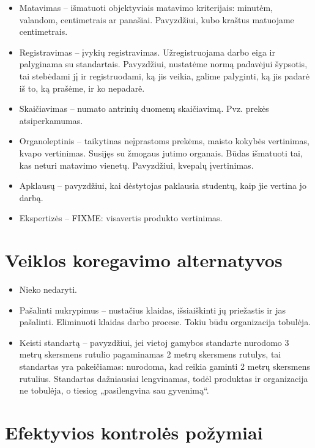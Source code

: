 \begin{itemize}
  \item Matavimas – išmatuoti objektyviais matavimo kriterijais: minutėm,
    valandom, centimetrais ar panašiai. Pavyzdžiui, kubo kraštus matuojame
    centimetrais.
  \item Registravimas – įvykių registravimas. Užregistruojama darbo
    eiga ir palyginama su standartais. Pavyzdžiui, nustatėme normą padavėjui
    šypsotis, tai stebėdami jį ir registruodami, ką jis veikia, galime
    palyginti, ką jis padarė iš to, ką prašėme, ir ko nepadarė.
  \item Skaičiavimas – numato antrinių duomenų skaičiavimą. Pvz.
    prekės atsiperkamumas.
  \item Organoleptinis – taikytinas neįprastoms prekėms, maisto
    kokybės vertinimas, kvapo vertinimas. Susijęs su žmogaus jutimo
    organais. Būdas išmatuoti tai, kas neturi matavimo vienetų. Pavyzdžiui,
    kvepalų įvertinimas.
  \item Apklausų – pavyzdžiui, kai dėstytojas paklausia studentų, kaip
    jie vertina jo darbą.
  \item Ekspertizės – FIXME: visavertis produkto vertinimas.
\end{itemize}

\section{Veiklos koregavimo alternatyvos}

\begin{itemize}
  \item Nieko nedaryti.
  \item Pašalinti nukrypimus – nustačius klaidas, išsiaiškinti jų priežastis
    ir jas pašalinti. Eliminuoti klaidas darbo procese. Tokiu būdu
    organizacija tobulėja.
  \item Keisti standartą – pavyzdžiui, jei vietoj gamybos standarte
    nurodomo 3 metrų skersmens rutulio pagaminamas 2 metrų skersmens
    rutulys, tai standartas yra pakeičiamas: nurodoma, kad reikia gaminti
    2 metrų skersmens rutulius. Standartas dažniausiai lengvinamas, todėl
    produktas ir organizacija ne tobulėja, o tiesiog „pasilengvina sau
    gyvenimą“.
\end{itemize}

\section{Efektyvios kontrolės požymiai}

